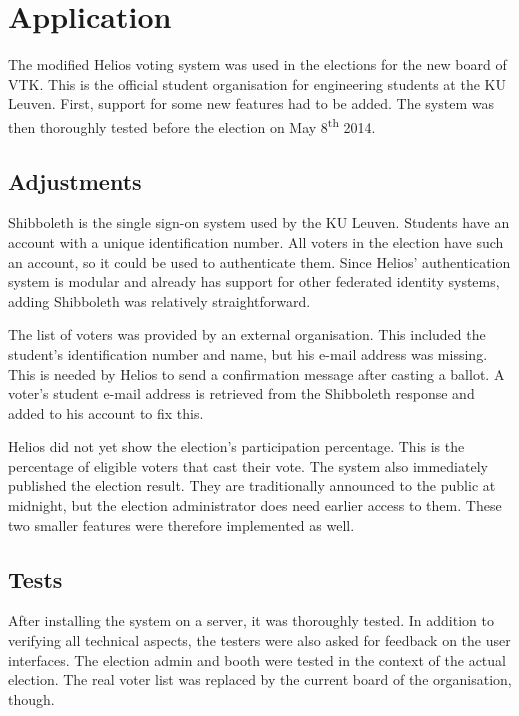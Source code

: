 % 
%

\section{Application}

The modified Helios voting system was used in the elections for the new board of VTK. This is the official student organisation for engineering students at the KU Leuven. First, support for some new features had to be added. The system was then thoroughly tested before the election on May 8\textsuperscript{th} 2014.

\subsection{Adjustments}

Shibboleth is the single sign-on system used by the KU Leuven. Students have an account with a unique identification number. All voters in the election have such an account, so it could be used to authenticate them. Since Helios' authentication system is modular and already has support for other federated identity systems, adding Shibboleth was relatively straightforward.

\par The list of voters was provided by an external organisation. This included the student's identification number and name, but his e-mail address was missing. This is needed by Helios to send a confirmation message after casting a ballot. A voter's student e-mail address is retrieved from the Shibboleth response and added to his account to fix this.

\par Helios did not yet show the election's participation percentage. This is the percentage of eligible voters that cast their vote. The system also immediately published the election result. They are traditionally announced to the public at midnight, but the election administrator does need earlier access to them. These two smaller features were therefore implemented as well.

\subsection{Tests}

After installing the system on a server, it was thoroughly tested. In addition to verifying all technical aspects, the testers were also asked for feedback on the user interfaces. The election admin and booth were tested in the context of the actual election. The real voter list was replaced by the current board of the organisation, though.

